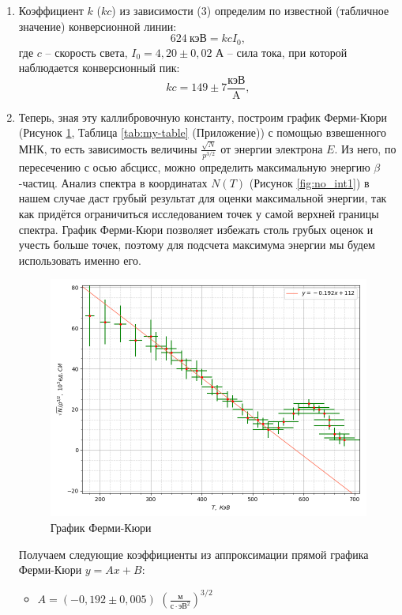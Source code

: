 \documentclass{article}
\begin{document}
\begin{enumerate}
	
		\item  Коэффициент $k$ ($kc$) из зависимости (3)  определим по известной (табличное значение) конверсионной линии:
			$$624 \ \text{кэВ} = kcI_0,$$
		где $c$ -- скорость света, $I_0 = 4,20 \pm 0,02$ А -- сила тока, при которой наблюдается конверсионный пик:
		\begin{equation*}
			kc = 149 \pm 7 \frac{\text{кэВ}}{\text{A}},
		\end{equation*}
	 	
	 	\item Теперь, зная эту каллибровочную константу, построим график Ферми-Кюри (Рисунок \ref{fig:no_int2}, Таблица \ref{tab:my-table} (Приложение)) с помощью взвешенного МНК, то есть зависимость величины $\frac{\sqrt{N}}{p^{3/2}}$ от энергии электрона $E$. Из него, по пересечению с осью абсцисс, можно определить максимальную энергию $\beta$-частиц. Анализ спектра в координатах $ N(T)$ (Рисунок \ref{fig:no_int1}) в нашем случае даст грубый результат для оценки максимальной энергии, так как придётся ограничиться исследованием точек у самой верхней границы спектра. График Ферми-Кюри позволяет избежать столь грубых оценок и учесть больше точек, поэтому для подсчета максимума энергии мы будем использовать именно его.
		
	


		\begin{figure}[h!]
			\centering
			\includegraphics[scale = 0.67]{5.4.2 (2).png}
			\caption{График Ферми-Кюри}
            \label{fig:no_int2}
		\end{figure}
	
		Получаем следующие коэффициенты из аппроксимации прямой графика Ферми-Кюри $y = Ax + B$:
		\begin{itemize}
			\item $A = (-0,192 \pm 0,005)$ $(\frac{\text{м}}{\text{с} \cdot \text{эВ}^2})^{3/2 }$
			

\end{itemize}
\end{enumerate}
\end{document}
